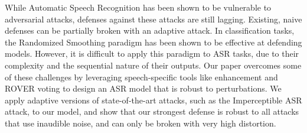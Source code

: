 While Automatic Speech Recognition has been shown to be vulnerable to adversarial attacks, defenses against these attacks are still lagging. Existing, naive defenses can be partially broken with an adaptive attack. In classification tasks, the Randomized Smoothing paradigm has been shown to be effective at defending models. However, it is difficult to apply this paradigm to ASR tasks, due to their complexity and the sequential nature of their outputs. Our paper overcomes some of these challenges by leveraging speech-specific tools like enhancement and ROVER voting to design an ASR model that is robust to perturbations. We apply adaptive versions of state-of-the-art attacks, such as the Imperceptible ASR attack, to our model, and show that our strongest defense is robust to all attacks that use inaudible noise, and can only be broken with very high distortion.
